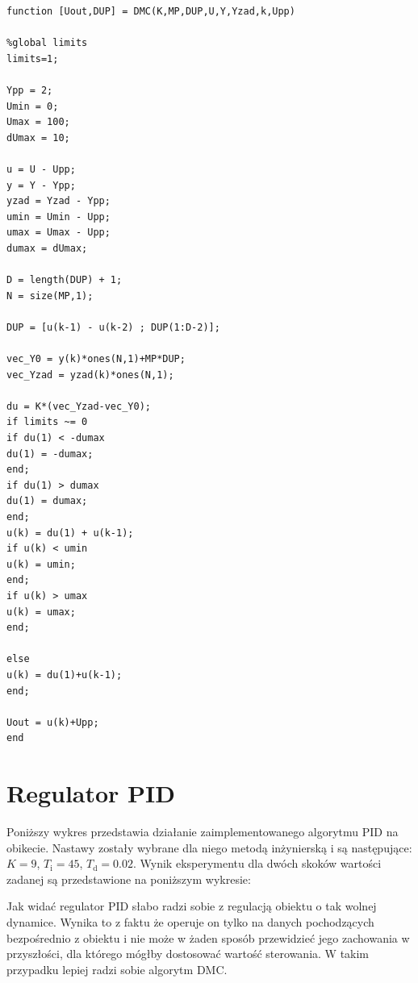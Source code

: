 \begin{lstlisting}[style=customc,frame=single] 
function [Uout,DUP] = DMC(K,MP,DUP,U,Y,Yzad,k,Upp)

%global limits
limits=1;

Ypp = 2;
Umin = 0;
Umax = 100;
dUmax = 10;

u = U - Upp;
y = Y - Ypp;
yzad = Yzad - Ypp;
umin = Umin - Upp;
umax = Umax - Upp;
dumax = dUmax;

D = length(DUP) + 1;
N = size(MP,1);

DUP = [u(k-1) - u(k-2) ; DUP(1:D-2)];

vec_Y0 = y(k)*ones(N,1)+MP*DUP;
vec_Yzad = yzad(k)*ones(N,1);

du = K*(vec_Yzad-vec_Y0);
if limits ~= 0
if du(1) < -dumax
du(1) = -dumax;
end;
if du(1) > dumax
du(1) = dumax;
end;
u(k) = du(1) + u(k-1);
if u(k) < umin
u(k) = umin;
end;
if u(k) > umax
u(k) = umax;
end;

else
u(k) = du(1)+u(k-1);
end;

Uout = u(k)+Upp;
end
\end{lstlisting}

\section{Regulator PID}
Poniższy wykres przedstawia działanie zaimplementowanego algorytmu PID na obikecie. Nastawy zostały wybrane dla niego metodą inżynierską i są następujące: $K=9$, $T_\mathrm{i}=45$, $T_\mathrm{d}=0.02$. Wynik eksperymentu dla dwóch skoków wartości zadanej są przedstawione na poniższym wykresie:
\begin{figure}

\end{figure}
\begin{figure}

\end{figure}
\FloatBarrier
Jak widać regulator PID słabo radzi sobie z regulacją obiektu o tak wolnej dynamice. Wynika to z faktu że operuje on tylko na danych pochodzących bezpośrednio z obiektu i nie może w żaden sposób przewidzieć jego zachowania w przyszłości, dla którego mógłby dostosować wartość sterowania. W takim przypadku lepiej radzi sobie algorytm DMC.
